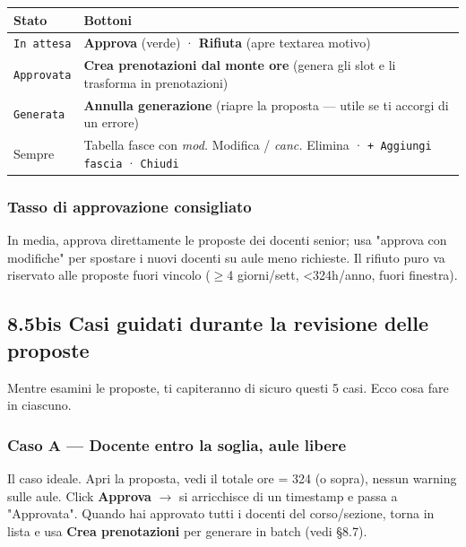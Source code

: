\documentclass[11pt,a4paper]{article}
\begin{document}
\begin{table}[H]
\centering
\small
\begin{tabularx}{\linewidth}{|X|X|}
\hline
\rowcolor{tableheader} Stato & Bottoni \\
\hline
\texttt{In attesa} & \textbf{Approva} (verde) · \textbf{Rifiuta} (apre textarea motivo) \\
\hline
\texttt{Approvata} & \textbf{Crea prenotazioni dal monte ore} (genera gli slot e li trasforma in prenotazioni) \\
\hline
\texttt{Generata} & \textbf{Annulla generazione} (riapre la proposta --- utile se ti accorgi di un errore) \\
\hline
Sempre & Tabella fasce con \textit{mod.} Modifica / \textit{canc.} Elimina · \texttt{+ Aggiungi fascia} · \texttt{Chiudi} \\
\hline
\end{tabularx}
\end{table}


\subsubsection{Tasso di approvazione consigliato}


In media, approva direttamente le proposte dei docenti senior; usa "approva con modifiche" per spostare i nuovi docenti su aule meno richieste. Il rifiuto puro va riservato alle proposte fuori vincolo ($\geq$4 giorni/sett, \textless{}324h/anno, fuori finestra).

\subsection{8.5bis Casi guidati durante la revisione delle proposte}


Mentre esamini le proposte, ti capiteranno di sicuro questi 5 casi. Ecco cosa fare in ciascuno.

\subsubsection{Caso A --- Docente entro la soglia, aule libere}


Il caso ideale. Apri la proposta, vedi il totale ore = 324 (o sopra), nessun warning sulle aule. Click \textbf{Approva} $\rightarrow$ si arricchisce di un timestamp e passa a "Approvata". Quando hai approvato tutti i docenti del corso/sezione, torna in lista e usa \textbf{Crea prenotazioni} per generare in batch (vedi §8.7).
\end{document}

